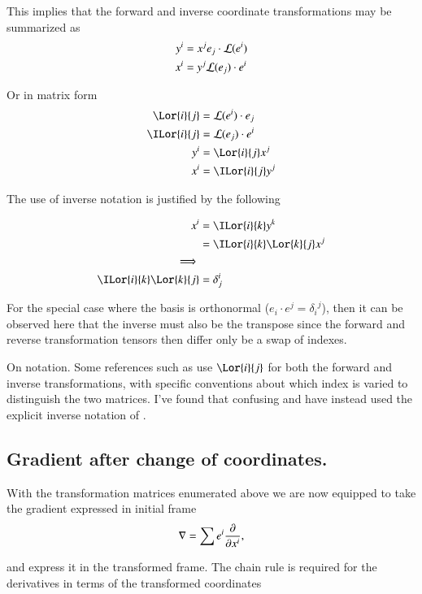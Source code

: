This implies that the forward and inverse coordinate transformations may be summarized as
\begin{align*}
y^i &= x^j e_j \cdot \mathcal{L}(e^i) \\
x^i &= y^j \mathcal{L}(e_j) \cdot e^i \\
\end{align*}

Or in matrix form
\begin{align}\label{eqn:sphericalPolar:coordinateTxTensors}
\Lor{i}{j} &= \LL(e^i) \cdot e_j \\
\ILor{i}{j} &= \LL(e_j) \cdot e^i \\
y^i &= \Lor{i}{j} x^j \\
x^i &= \ILor{i}{j} y^j
\end{align}


The use of inverse notation is justified by the following

\begin{align*}
x^i &= \ILor{i}{k} y^k \\
&= \ILor{i}{k} \Lor{k}{j} x^j \\
\implies \\
\ILor{i}{k} \Lor{k}{j} &= \delta^i_j
\end{align*}

For the special case where the basis is orthonormal ($e_i \cdot e^j = {\delta_i}^j$), then it can be observed here that the inverse must also be the
transpose since the forward and reverse transformation tensors then differ only be a swap of indexes. 

On notation.  Some references such as \cite{MinahanTensors} use $\Lor{i}{j}$ for both the forward and inverse transformations, with specific conventions
about which index is varied to distinguish the two matrices.  I've found that confusing and have instead used the explicit inverse notation
of \cite{SpenceTensors}.



\subsection{Gradient after change of coordinates. }

With the transformation matrices enumerated above we are now equipped to take the gradient expressed in initial frame
\begin{align*}
\nabla = \sum e^i \frac{\partial {}}{\partial {x^i}},
\end{align*}

and express it in the transformed frame.  The chain rule is required for the derivatives in terms of the transformed coordinates

